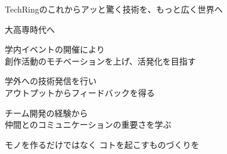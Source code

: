 \documentclass[dvipdfmx]{beamer}
\begin{document}
\begin{frame}{TechRingのこれから}{アッと驚く技術を、もっと広く世界へ}

  \vspace{-5mm}

  \begin{block}{大高専時代へ}
    \vspace{2mm}
    \begin{description}
      \setlength{\itemsep}{2mm}
      \item[創造の意欲] 学内イベントの開催により\\
      創作活動のモチベーションを上げ、活発化を目指す
      \item[幅広い視野] 学外への技術発信を行い\\
      アウトプットからフィードバックを得る
      \item[自律と友愛] チーム開発の経験から\\
      仲間とのコミュニケーションの重要さを学ぶ
    \end{description}
  \end{block}

  \vfill

  \begin{Large}
    モノを作るだけではなく \vfill \hspace{7em}\alert{コトを起こす}ものづくりを
  \end{Large}
\end{frame}
\end{document}
